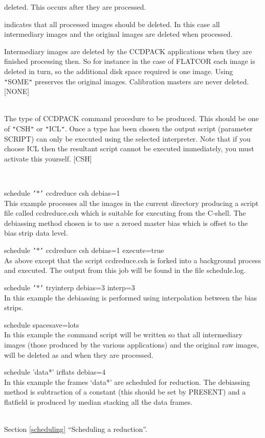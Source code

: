 \documentclass[twoside,11pt]{article}
\newcommand{\htmlref}[2]{#1}
\newcommand{\latexhtml}[2]{#1}
\renewcommand{\_}{\texttt{\symbol{95}}}
\newcommand{\qt}[1]{{\tt "}#1{\tt "}}
\newcommand{\qs}[1]{{\tt '}#1{\tt '}}
\newcommand{\xroutine}[1]{\htmlref{{\sc #1}}{#1}}
\newcommand{\secref}[2]{\latexhtml{Section \ref{#1} ``#2''}{``\htmlref{#2}{#1}''}}
\newcommand{\sstexamples}[1]{
   \item[Examples:] \mbox{} \\
   \vspace{-3.5ex}
   \begin{description}
      #1
   \end{description}
}
\newcommand{\sstsubsection}[1]{ \item[{#1}] \mbox{} \\}
\newcommand{\sstexamplesubsection}[2]{\sloppy \item{\ssttt #1} \mbox{} \\ #2 }
\newcommand{\sstdiytopic}[2]{\item[#1:] \mbox{} \\[1.3ex] #2}
\newcommand{\sstexamples}[1]{
      \item[Examples:] \\
      \begin{description}
         #1
      \end{description}
      \\
   }
\newcommand{\sstsubsection}[1]{\item[{#1}]}
\newcommand{\sstexamplesubsection}[2]{\item[{\ssttt #1}] #2}
\newcommand{\sstdiytopic}[2]{\item[{#1:}] #2 }
\begin{document}
{{{\begin{description}
                   deleted. This occurs after they are processed.
            \item[\qt{LOTS}] indicates that all processed images should be deleted.
                   In this case all intermediary images and the original
                   images are deleted when processed.
         \end{description}
         Intermediary images are deleted by the CCDPACK applications when
         they are finished processing then. So for instance in the case
         of \xroutine{FLATCOR} each image is deleted in turn, so the additional disk
         space required is one image. Using \qt{SOME} preserves the original
         images. Calibration masters are never deleted.
         [NONE]
      }
      \sstsubsection{
         STYPE = LITERAL (Read)
      }{
         The type of CCDPACK command procedure to be produced. This
         should be one of \qt{CSH} or \qt{ICL}. Once a type has been
         chosen the output script (parameter SCRIPT) can only be
         executed using the selected interpreter. Note that if you
         choose ICL then the resultant script cannot be executed
         immediately, you must activate this yourself.
         [CSH]
      }
   }
   \sstexamples{
      \sstexamplesubsection{
         schedule \qs{$*$} ccdreduce csh debias=1
      }{
         This example processes all the images in the current directory
         producing a script file called ccdreduce.csh which is suitable
         for executing from the C-shell. The debiassing method chosen is
         to use a zeroed master bias which is offset to the bias strip
         data level.
      }
      \sstexamplesubsection{
         schedule \qs{$*$} ccdreduce csh debias=1 execute=true
      }{
         As above except that the script ccdreduce.csh is forked into a
         background process and executed. The output from this job will
         be found in the file schedule.log.
      }
      \sstexamplesubsection{
         schedule \qs{$*$} tryinterp debias=3 interp=3
      }{
         In this example the debiassing is performed using interpolation
         between the bias strips.
      }
      \sstexamplesubsection{
         schedule spacesave=lots
      }{
         In this example the command script will be written so that all
         intermediary images (those produced by the various applications)
         and the original raw images, will be deleted as and when they are
         processed.
      }
      \sstexamplesubsection{
         schedule 'data*' irflats debias=4
      } {
         In this example the frames `data*' are scheduled for reduction.
         The debiassing method is subtraction of a constant (this should
         be set by \xroutine{PRESENT}) and a flatfield is produced by
         median stacking all the data frames.
      }
   }
   \sstdiytopic{
      See also
   } {
      \secref{scheduling}{Scheduling a reduction}.
   }
}
\end{document}
